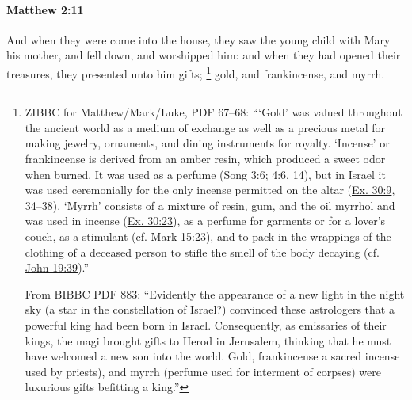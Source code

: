 		\paragraph{Matthew 2:11} %
			\label{MATTHEW-2-11}

			And when they were come into the house, they saw the young child with Mary his mother, and fell down, and worshipped him: and when they had opened their treasures, they presented unto him gifts;
				\footnote{%
					ZIBBC for Matthew/Mark/Luke, PDF 67--68: ```Gold' was valued throughout the ancient world as a medium of exchange as well as a precious metal for making jewelry, ornaments, and dining instruments for royalty. `Incense' or frankincense is derived from an amber resin, which produced a sweet odor when burned. It was used as a perfume (Song 3:6; 4:6, 14), but in Israel it was used ceremonially for the only incense permitted on the altar (\hyperref[EXODUS-30-9]{Ex. 30:9}, \hyperref[EXODUS-39-34]{34--38}). `Myrrh' consists of a mixture of resin, gum, and the oil myrrhol and was used in incense (\hyperref[EXODUS-30-23]{Ex. 30:23}), as a perfume for garments or for a lover's couch, as a stimulant (cf. \hyperref[MARK-15-23]{Mark 15:23}), and to pack in the wrappings of the clothing of a deceased person to stifle the smell of the body decaying (cf. \hyperref[JOHN-19-39]{John 19:39}).''
					
					From BIBBC PDF 883: ``Evidently the appearance of a new light in the night sky (a star in the constellation of Israel?) convinced these astrologers that a powerful king had been born in Israel. Consequently, as emissaries of their kings, the magi brought gifts to Herod in Jerusalem, thinking that he must have welcomed a new son into the world. Gold, frankincense  a sacred incense used by priests), and myrrh (perfume used for interment of corpses) were luxurious gifts befitting a king.''
					}%
			gold, and frankincense, and myrrh.

			\begin{framed}
			\scriptsize
				\begin{compactdesc}
					\item[SBLG] 
				\end{compactdesc}
			\end{framed}

